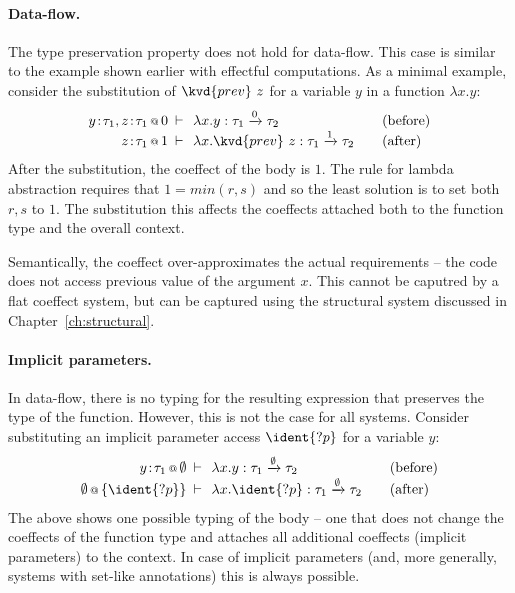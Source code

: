 \paragraph{Data-flow.} 
The type preservation property does not hold for data-flow. This case is similar to the example
shown earlier with effectful computations. As a minimal example, consider the substitution of 
$\kvd{prev}~z$ for a variable $y$ in a function $\lambda x.y$:
%
\begin{equation*}
\begin{array}{rclcl}
 \coctx{y\!:\!\tau_1,z\!:\!\tau_1}{0} &\narrow{\vdash}& \lambda x.y : \tau_1 \xrightarrow{0} \tau_2 & & (\textnormal{before}) \\
 \coctx{z\!:\!\tau_1}{1} &\narrow{\vdash}& \lambda x.\kvd{prev}~z : \tau_1 \xrightarrow{1} \tau_2 & & (\textnormal{after}) \\
\end{array}
\end{equation*}
%
After the substitution, the coeffect of the body is $1$. The rule for lambda abstraction requires
that $1=\mathit{min}(r,s)$ and so the least solution is to set both $r,s$ to $1$. The substitution
this affects the coeffects attached both to the function type and the overall context. 

Semantically, the coeffect over-approximates the actual requirements -- the code does not access
previous value of the argument $x$. This cannot be caputred by a flat coeffect system, but can
be captured using the structural system discussed in Chapter~\ref{ch:structural}. 

\paragraph{Implicit parameters.} In data-flow, there is no typing for the resulting expression that
preserves the type of the function. However, this is not the case for all systems. Consider substituting
an implicit parameter access $\ident{?p}$ for a variable $y$:
%
\begin{equation*}
\begin{array}{rclcl}
 \coctx{y\!:\!\tau_1}{\emptyset} &\narrow{\vdash}& \lambda x.y : \tau_1 \xrightarrow{\emptyset} \tau_2 & & (\textnormal{before}) \\
 \coctx{\emptyset}{ \{\ident{?p}\} } &\narrow{\vdash}& \lambda x.\ident{?p} : \tau_1 \xrightarrow{\emptyset} \tau_2 & & (\textnormal{after}) \\
\end{array}
\end{equation*}
%
The above shows one possible typing of the body -- one that does not change the coeffects of the 
function type and attaches all additional coeffects (implicit parameters) to the context. In case
of implicit parameters (and, more generally, systems with set-like annotations) this is always 
possible. 

